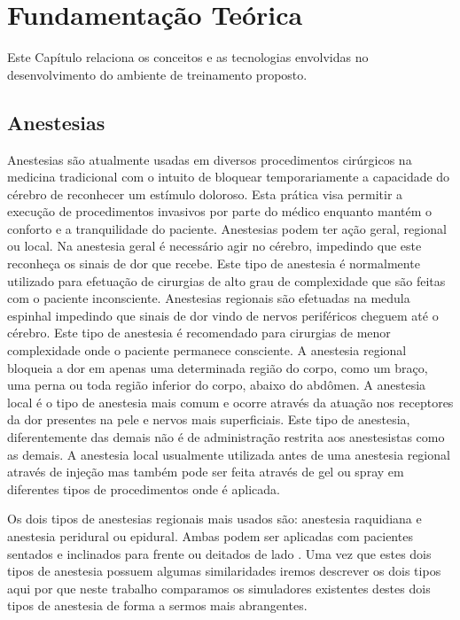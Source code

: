 \chapter{Fundamentação Teórica} \label{cap:cap2}

Este Capítulo relaciona os conceitos e as tecnologias envolvidas no desenvolvimento do ambiente de treinamento proposto. 

\section{Anestesias}

Anestesias são atualmente usadas em diversos procedimentos cirúrgicos na medicina tradicional com o intuito de bloquear temporariamente a capacidade do cérebro de reconhecer um estímulo doloroso. Esta prática visa permitir a execução de procedimentos invasivos por parte do médico enquanto mantém o conforto e a tranquilidade do paciente. Anestesias podem ter ação geral, regional ou local. Na anestesia geral é necessário agir no cérebro, impedindo que este reconheça os sinais de dor que recebe. Este tipo de anestesia é normalmente utilizado para efetuação de cirurgias de alto grau de complexidade que são feitas com o paciente inconsciente. Anestesias regionais são efetuadas na medula espinhal impedindo que sinais de dor vindo de nervos periféricos cheguem até o cérebro. Este tipo de anestesia é recomendado para cirurgias de menor complexidade onde o paciente permanece consciente. A anestesia regional bloqueia a dor em apenas uma determinada região do corpo, como um braço, uma perna ou toda região inferior do corpo, abaixo do abdômen. A anestesia local é o tipo de anestesia mais comum e ocorre através da atuação nos receptores da dor presentes na pele e nervos mais superficiais. Este tipo de anestesia, diferentemente das demais não é de administração restrita aos anestesistas como as demais. A anestesia local usualmente utilizada antes de uma anestesia regional através de injeção mas também pode ser feita através de gel ou spray em diferentes tipos de procedimentos onde é aplicada\cite{Pinheiro2018}.

Os dois tipos de anestesias regionais mais usados são: anestesia raquidiana e anestesia peridural ou epidural. Ambas podem ser aplicadas com pacientes sentados e inclinados para frente ou deitados de lado \cite{Anesclin2019}. Uma vez que estes dois tipos de anestesia possuem algumas similaridades iremos descrever os dois tipos aqui por que neste trabalho comparamos os simuladores existentes destes dois tipos de anestesia de forma a sermos mais abrangentes.  

